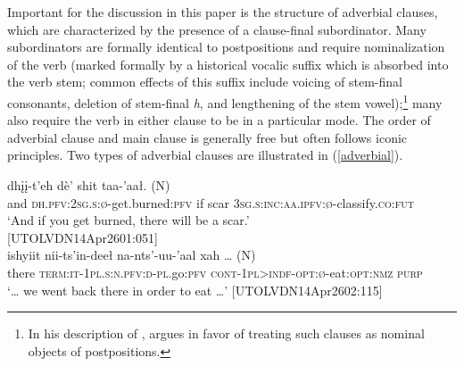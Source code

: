 \documentclass[output=paper,colorlinks,citecolor=brown]{langscibook}
\begin{document}

Important for the discussion in this paper is the structure of adverbial clauses, which are characterized by the presence of a clause-final subordinator. Many subordinators are formally identical to postpositions and require nominalization of the verb (marked formally by a historical vocalic suffix which is absorbed into the verb stem; common effects of this suffix include voicing of stem-final consonants, deletion of stem-final \textit{h}, and lengthening of the stem vowel);\footnote{In his description of , \citet[375–381]{CookED2004} argues in favor of treating such clauses as nominal objects of postpositions.} many also require the verb in either clause to be in a particular mode. The order of adverbial clause and main clause is generally free but often follows iconic principles. Two types of adverbial clauses are illustrated in (\ref{adverbial}).

\begin{exe}
\ex\label{adverbial}
\begin{xlista}
\ex
{} dhįį-t'eh dè' shit {taa-'aał. \textnormal{(N)}} \\
and \textsc{dh.pfv:2sg.s:ø}-get.burned:\textsc{pfv} if scar \textsc{3sg.s:inc:aa.ipfv:ø}-classify.\textsc{co:fut} \\
\glt `And if you get burned, there will be a scar.' \\ \hfill [UTOLVDN14Apr2601:051]\\
\ex
\gll  {\ldots} ishyiit nii-ts'in-deeł na-nts'-uu-'aal {xah {\ldots} \textnormal{(N)}} \\
{} there \textsc{term:it-1pl.s:n.pfv:d-pl}.go:\textsc{pfv} \textsc{cont-1pl>indf-opt:ø}-eat:\textsc{opt:nmz} \textsc{purp} \\
\glt `{\ldots} we went back there in order to eat \ldots' \hfill [UTOLVDN14Apr2602:115] \\
\end{xlista}
\end{exe}
\end{document}

